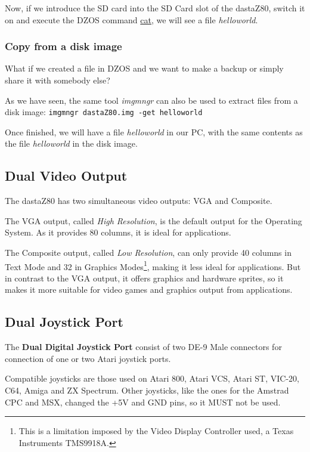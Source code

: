         Now, if we introduce the SD card into the SD Card slot of the dastaZ80,
        switch it on and execute the DZOS command \hyperref[cmd:cat]{cat}, we will
        see a file \textit{helloworld}.

        \subsubsection{Copy from a disk image}

        What if we created a file in DZOS and we want to make a backup or simply
        share it with somebody else?

        As we have seen, the same tool \textit{imgmngr} can also be used to extract
        files from a disk image: \texttt{imgmngr dastaZ80.img -get helloworld}

        Once finished, we will have a file \textit{helloworld} in our PC, with the
        same contents as the file \textit{helloworld} in the disk image.

    \subsection{Dual Video Output}

    The dastaZ80 has two simultaneous video outputs: VGA and Composite.

    The VGA output, called \textit{High Resolution}, is the default output for
    the Operating System. As it provides 80 columns, it is ideal for
    applications.

    The Composite output, called \textit{Low Resolution}, can only provide 40
    columns in Text Mode and 32 in Graphics Modes\footnote{This is a limitation
    imposed by the Video Display Controller used, a Texas Instruments TMS9918A.},
    making it less ideal for applications. But in contrast to the VGA output, it
    offers graphics and hardware sprites, so it makes it more suitable for video
    games and graphics output from applications.

    \subsection{Dual Joystick Port}
    The \textbf{Dual Digital Joystick Port} consist of two DE-9 Male connectors
    for connection of one or two Atari joystick ports.

    Compatible joysticks are those used on Atari 800, Atari VCS, Atari ST,
    VIC-20, C64, Amiga and ZX Spectrum. Other joysticks, like the ones for the
    Amstrad CPC and MSX, changed the +5V and GND pins, so it MUST not be used.